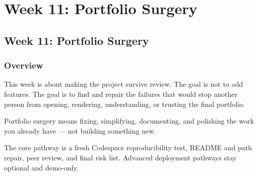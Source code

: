 \documentclass[
  letterpaper,
  DIV=11,
  numbers=noendperiod,
  oneside]{scrreprt}
\begin{document}
\part{Week 11: Portfolio Surgery}

\chapter*{Week 11: Portfolio Surgery}\label{week-11-portfolio-surgery-1}


\section*{Overview}\label{overview-10}


This week is about making the project survive review. The goal is not to
add features. The goal is to find and repair the failures that would
stop another person from opening, rendering, understanding, or trusting
the final portfolio.

Portfolio surgery means fixing, simplifying, documenting, and polishing
the work you already have --- not building something new.

The core pathway is a fresh Codespace reproducibility test, README and
path repair, peer review, and final risk list. Advanced deployment
pathways stay optional and demo-only.
\end{document}
